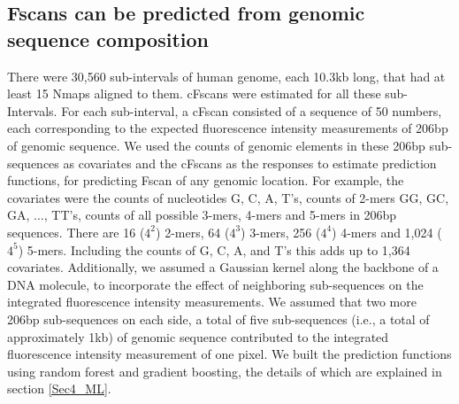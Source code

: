 \subsection{Fscans can be predicted from genomic sequence composition}
There were 30,560 sub-intervals of human genome, each 10.3kb long, that had at least 15 Nmaps aligned to them. cFscans were estimated for all these sub-Intervals. For each sub-interval, a cFscan consisted of a sequence of 50 numbers, each corresponding to the expected fluorescence intensity measurements of 206bp of genomic sequence. We used the counts of genomic elements in these 206bp sub-sequences as covariates and the cFscans as the responses to estimate prediction functions, for predicting Fscan of any genomic location. For example, the covariates were the counts of nucleotides G, C, A, T's, counts of 2-mers GG, GC, GA, ..., TT's, counts of all possible 3-mers, 4-mers and 5-mers in 206bp sequences. There are 16 ($4^2$) 2-mers, 64 ($4^3$) 3-mers, 256 ($4^4$) 4-mers and 1,024 ($4^5$) 5-mers. Including the counts of G, C, A, and T's this adds up to 1,364 covariates. Additionally, we assumed a Gaussian kernel along the backbone of a DNA molecule, to incorporate the effect of neighboring sub-sequences on the integrated fluorescence intensity measurements. We assumed that two more 206bp sub-sequences on each side, a total of five sub-sequences (i.e., a total of approximately 1kb) of genomic sequence contributed to the integrated fluorescence intensity measurement of one pixel. We built the prediction functions using random forest and gradient boosting, the details of which are explained in section \ref{Sec4_ML}. 

